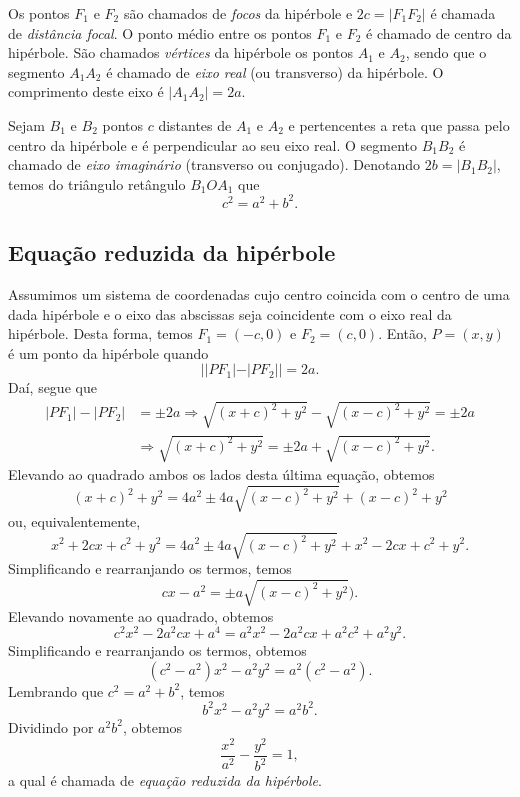 Os pontos $F_1$ e $F_2$ são chamados de \emph{focos} da hipérbole e $2c = |F_1F_2|$ é chamada de \emph{distância focal}. O ponto médio entre os pontos $F_1$ e $F_2$ é chamado de centro da hipérbole. São chamados \emph{vértices} da hipérbole os pontos $A_1$ e $A_2$, sendo que o segmento $A_1A_2$ é chamado de \emph{eixo real} (ou transverso) da hipérbole. O comprimento deste eixo é $|A_1A_2|=2a$.

Sejam $B_1$ e $B_2$ pontos $c$ distantes de $A_1$ e $A_2$ e pertencentes a reta que passa pelo centro da hipérbole e é perpendicular ao seu eixo real. O segmento $B_1B_2$ é chamado de \emph{eixo imaginário} (transverso ou conjugado). Denotando $2b=|B_1B_2|$, temos do triângulo retângulo $B_1OA_1$ que
\begin{equation}
  c^2 = a^2 + b^2.
\end{equation}

\subsection{Equação reduzida da hipérbole}

Assumimos um sistema de coordenadas cujo centro coincida com o centro de uma dada hipérbole e o eixo das abscissas seja coincidente com o eixo real da hipérbole. Desta forma, temos $F_1 = (-c,0)$ e $F_2 = (c,0)$. Então, $P=(x,y)$ é um ponto da hipérbole quando
\begin{equation}
  ||PF_1|-|PF_2|| = 2a.
\end{equation}
Daí, segue que
\begin{align}
  |PF_1|-|PF_2| &= \pm 2a \Rightarrow \sqrt{(x+c)^2+y^2}-\sqrt{(x-c)^2+y^2}=\pm 2a\\
                &\Rightarrow \sqrt{(x+c)^2+y^2} = \pm 2a + \sqrt{(x-c)^2+y^2}.
\end{align}
Elevando ao quadrado ambos os lados desta última equação, obtemos
\begin{equation}
  (x+c)^2+y^2 = 4a^2 \pm 4a\sqrt{(x-c)^2+y^2} + (x-c)^2+y^2
\end{equation}
ou, equivalentemente,
\begin{equation}
  x^2+2cx+c^2+y^2=4a^2\pm4a\sqrt{(x-c)^2+y^2}+x^2-2cx+c^2+y^2.
\end{equation}
Simplificando e rearranjando os termos, temos
\begin{equation}
  cx - a^2 = \pm a\sqrt{(x-c)^2+y^2}).
\end{equation}
Elevando novamente ao quadrado, obtemos
\begin{equation}
  c^2x^2 - 2a^2cx + a^4 = a^2x^2 - 2a^2cx + a^2c^2 + a^2y^2.
\end{equation}
Simplificando e rearranjando os termos, obtemos
\begin{equation}
  (c^2-a^2)x^2 - a^2y^2 = a^2(c^2-a^2).
\end{equation}
Lembrando que $c^2 = a^2 + b^2$, temos
\begin{equation}
  b^2x^2 - a^2y^2 = a^2b^2.
\end{equation}
Dividindo por $a^2b^2$, obtemos
\begin{equation}
  \frac{x^2}{a^2} - \frac{y^2}{b^2} = 1,
\end{equation}
a qual é chamada de \emph{equação reduzida da hipérbole}.

